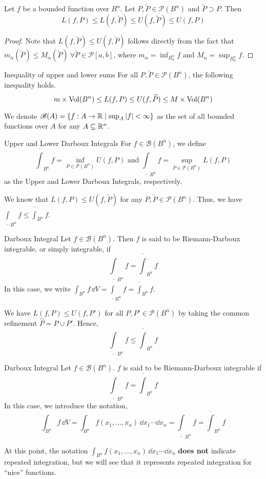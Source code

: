 \documentclass[../Analysis-3.tex]{subfiles}
\begin{document}
\begin{Thm}{}{}
  Let $f$ be a bounded function over $B^n$. Let $P, \widetilde{P} \in \mathscr{P}(B^n)$ and $\widetilde{P} \supset P$. Then
  \[  L(f,P) \leq L(f, \widetilde{P}) \leq U(f,\widetilde{P}) \leq U(f,P)  \]
\end{Thm}

\begin{proof}
  Note that $L(f, \widetilde{P}) \leq U(f,\widetilde{P})$ follows directly from the fact that $m_\alpha (\widetilde{P}) \leq M_\alpha (\widetilde{P})\ \forall \widetilde{P} \in \mathscr{P}[a,b]$, where $m_\alpha = \inf_{B^n_\alpha} f$ and $M_\alpha = \sup_{B_\alpha ^n} f$.
\end{proof}

\begin{Cor}{Inequality of upper and lower sums}{}
  For all $ P, \widetilde{P} \in \mathscr{P}(B^n) $, the following inequality holds.
  \[  m \times \operatorname{Vol}(B^n) \leq L(f,P) \leq U(f, \widetilde{P}) \leq M \times \operatorname{Vol}(B^n)  \]
\end{Cor}

We denote $ \mathscr{B}(A) = \{f:A \to \mathbb{R} \mid \sup_A \abs{f} < \infty\} $ as the set of all bounded functions over $ A $ for any $ A \subseteq \mathbb{R}^n $.

\begin{Def}{Upper and Lower Darboux Integrals}{}
  For $f \in \mathscr{B}(B^n)$, we define
  \[  \overline{\int}_{B^n} f = \inf_{P \in \mathscr{P}(B^n)} U(f,P) \text{  and  } \underline{\int}_{B^n} f = \sup_{P \in \mathscr{P}(B^n)} L(f,P)  \]
  as the Upper and Lower Darboux Integrals, respectively.
\end{Def}

We know that $L(f,P) \leq U(f, \widetilde{P})$ for any $P, \widetilde{P} \in \mathscr{P}(B^n)$. Thus, we have $\displaystyle\underline{\int}_{B^n} f \leq \overline{\int}_{B^n} f$.

\begin{Def}{Darboux Integral}{}
  Let $f \in \mathscr{B}(B^n)$. Then $f$ is said to be Riemann-Darboux integrable, or simply integrable, if
  \[  \underline{\int}_{B^n} f = \overline{\int}_{B^n} f  \]
  In this case, we write $\displaystyle\int_{B^n} f \, \dd V = \underline{\int}_{B^n} f = \overline{\int}_{B^n} f$.
\end{Def}

We have $L(f, P) \leq U(f, P')$ for all $P, P' \in \mathscr{P}(B^n)$ by taking the common refinement $\widehat{P} = P \cup P'$. Hence,
\[
  \underline{\int}_{B^n} f \leq \overline{\int}_{B^n} f
\]

\begin{Def}{Darboux Integral}{}
  Let \( f \in \mathscr{B}(B^n) \). \( f \) is said to be Riemann-Darboux integrable if
  \[
    \underline{\int}_{B^n} f = \overline{\int}_{B^n} f
  \]
  In this case, we introduce the notation,
  \[
    \int_{B^n} f \, \dd V = \int_{B^n} f(x_1, \dots, x_n) \, \dd x_1 \cdots \dd x_n = \underline{\int}_{B^n} f = \overline{\int}_{B^n} f
  \]
\end{Def}
At this point, the notation $\displaystyle\int_{B^n} f(x_1, \dots, x_n) \, \dd x_1 \cdots \dd x_n$ \textbf{does not} indicate repeated integration, but we will see that it represents repeated integration for ``nice'' functions.
\end{document}
